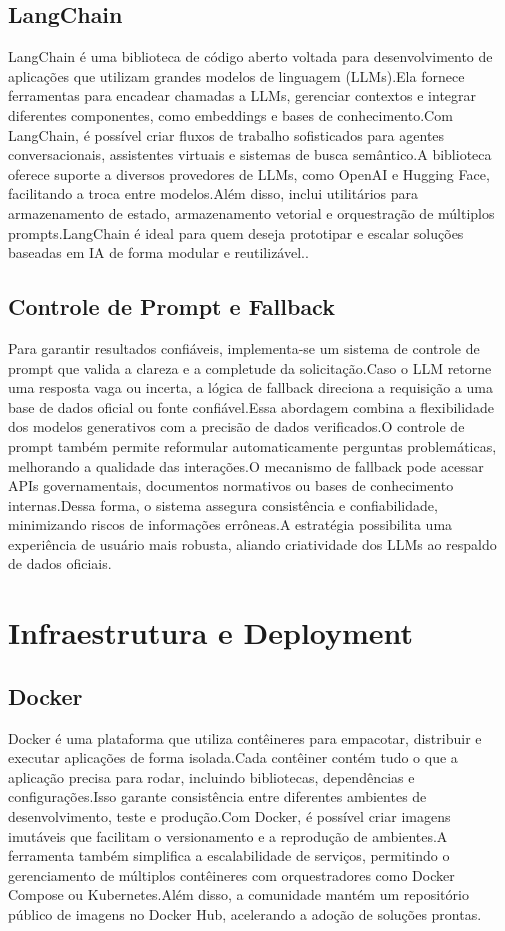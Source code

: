 \begin{description}
\subsection{LangChain}
LangChain é uma biblioteca de código aberto voltada para desenvolvimento de aplicações que utilizam grandes modelos de linguagem (LLMs).Ela fornece ferramentas para encadear chamadas a LLMs, gerenciar contextos e integrar diferentes componentes, como embeddings e bases de conhecimento.Com LangChain, é possível criar fluxos de trabalho sofisticados para agentes conversacionais, assistentes virtuais e sistemas de busca semântico.A biblioteca oferece suporte a diversos provedores de LLMs, como OpenAI e Hugging Face, facilitando a troca entre modelos.Além disso, inclui utilitários para armazenamento de estado, armazenamento vetorial e orquestração de múltiplos prompts.LangChain é ideal para quem deseja prototipar e escalar soluções baseadas em IA de forma modular e reutilizável.\cite{langchain2024}.

\subsection{Controle de Prompt e Fallback}
Para garantir resultados confiáveis, implementa-se um sistema de controle de prompt que valida a clareza e a completude da solicitação.Caso o LLM retorne uma resposta vaga ou incerta, a lógica de fallback direciona a requisição a uma base de dados oficial ou fonte confiável.Essa abordagem combina a flexibilidade dos modelos generativos com a precisão de dados verificados.O controle de prompt também permite reformular automaticamente perguntas problemáticas, melhorando a qualidade das interações.O mecanismo de fallback pode acessar APIs governamentais, documentos normativos ou bases de conhecimento internas.Dessa forma, o sistema assegura consistência e confiabilidade, minimizando riscos de informações errôneas.A estratégia possibilita uma experiência de usuário mais robusta, aliando criatividade dos LLMs ao respaldo de dados oficiais.

\section{Infraestrutura e Deployment}
\subsection{Docker}
Docker é uma plataforma que utiliza contêineres para empacotar, distribuir e executar aplicações de forma isolada.Cada contêiner contém tudo o que a aplicação precisa para rodar, incluindo bibliotecas, dependências e configurações.Isso garante consistência entre diferentes ambientes de desenvolvimento, teste e produção.Com Docker, é possível criar imagens imutáveis que facilitam o versionamento e a reprodução de ambientes.A ferramenta também simplifica a escalabilidade de serviços, permitindo o gerenciamento de múltiplos contêineres com orquestradores como Docker Compose ou Kubernetes.Além disso, a comunidade mantém um repositório público de imagens no Docker Hub, acelerando a adoção de soluções prontas.\cite{docker2024}



\end{description}
